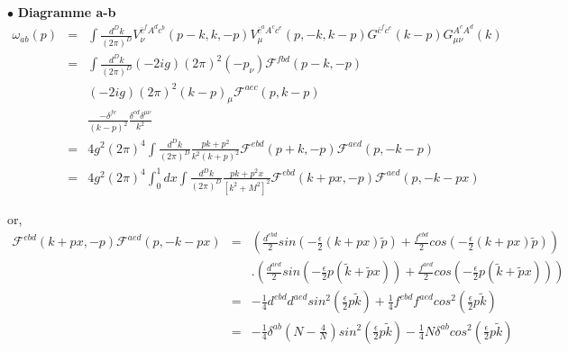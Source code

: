 \documentclass[a4paper,11pt]{article} %
\theoremstyle{plain}
\theoremstyle{definition}
\theoremstyle{remark}
\numberwithin{equation}{section}
\numberwithin{equation}{subsection}
\numberwithin{figure}{section}
\begin{document}
$\bullet$ \textbf{Diagramme a-b}
 \begin{eqnarray*}
  \omega_{ab}(p) &=&  \int  \frac{d^D k}{(2 \pi)^D}
V_{\nu}^{ \overline{c}^{f} A^{d} c^{b} } (p-k , k , -p )
V_{\mu}^{ \overline{c}^{a} A^{c} c^{e} } (p,-k,k-p )
G^{ \overline{c}^{f} c^{e} } (k-p)
G^{ A^{c} A^{d} }_{\mu \nu } (k)  \\
                               &=& \int  \frac{d^D k}{(2 \pi)^D}
(-2ig) (2 \pi)^2  (-p_{\nu}) \mathcal{F}^{fbd}(p-k , -p)  \nonumber \\
&&         (-2ig) (2 \pi)^2  (k-p)_{\mu} \mathcal{F}^{aec}(p , k-p) \nonumber \\
&&         \frac{-\delta^{fe}}{(k-p)^2}
\frac{\delta^{cd} \delta^{\mu \nu}}{k^2} \\
                               &=&  4 g^{2}  (2 \pi)^{4}  \int  \frac{d^D k}{(2 \pi)^D}
\frac{pk + p^2}{k^2(k+p)^2}
\mathcal{F}^{ebd}(p+k , -p)   \mathcal{F}^{aed}(p , -k-p)  \\
                               &=&  4 g^{2}  (2 \pi)^{4}
\int_ {0}^{1}  dx
\int  \frac{d^D k}{(2 \pi)^D}
\frac{pk + p^2x}{\left[ k^2 + M^2 \right]^2}
\mathcal{F}^{ebd}(k+px , -p)   \mathcal{F}^{aed}(p , -k-px)  
 \end{eqnarray*}

\noindent
or,
\begin{eqnarray*}
 \mathcal{F}^{ebd}(k+px , -p)   \mathcal{F}^{aed}(p , -k-px) &=&
\left(
\frac{d^{ebd}}{2}   sin \left( - \frac{\epsilon}{2}  ( k +px ) \tilde{p}    \right)   +    \frac{f^{ebd}}{2}   
cos \left(  - \frac{\epsilon}{2}  ( k +px ) \tilde{p}   \right)
\right) \nonumber \\
&&
.\left(
\frac{d^{aed}}{2}   sin \left(  - \frac{\epsilon}{2}  p ( \tilde{k}  + \tilde{p} x )   \right)   +    \frac{f^{aed}}{2}   
cos \left(  -\frac{\epsilon}{2} p ( \tilde{k}  + \tilde{p} x )   \right)
\right)  \\
                                                                                                 &=&
- \frac{1}{4} d^{ebd} d^{aed}  sin^{2} \left(  \frac{\epsilon}{2}  p \tilde{k}   \right)
+ \frac{1}{4} f^{ebd} f^{aed}  cos^{2} \left(  \frac{\epsilon}{2}  p \tilde{k}   \right) \\
                                                                                                 &=&
- \frac{1}{4}  \delta^{ab} \left( N-\frac{4}{N} \right)  sin^{2} \left(  \frac{\epsilon}{2}  p \tilde{k}   \right)
- \frac{1}{4} N \delta^{ab} cos^{2} \left(  \frac{\epsilon}{2}  p \tilde{k}   \right) \\
\end{eqnarray*}
\end{document}
